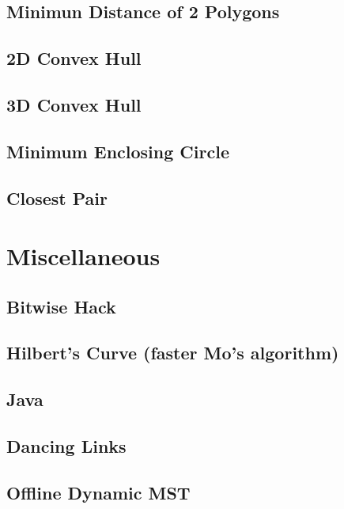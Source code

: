 \documentclass[a4paper,10pt,twocolumn,oneside]{article}
\begin{document}
\subsection{Minimun Distance of 2 Polygons}

\subsection{2D Convex Hull}

\subsection{3D Convex Hull}

% 
\subsection{Minimum Enclosing Circle}

\subsection{Closest Pair}

\section{Miscellaneous}
\subsection{Bitwise Hack}

\subsection{Hilbert's Curve (faster Mo's algorithm)}

\subsection{Java}

\subsection{Dancing Links}

\subsection{Offline Dynamic MST}

\end{document}
